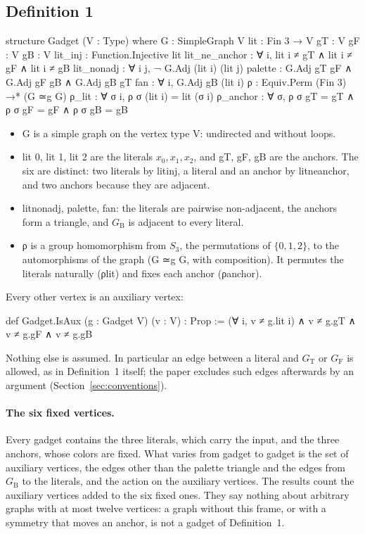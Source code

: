 \documentclass[11pt,a4paper]{article}
\newcommand{\leanus}{\textunderscore\allowbreak}
\newcommand{\lean}[1]{{\ttfamily\let\_\leanus #1}}
\newcommand{\GT}{G_{\mathrm{T}}}
\newcommand{\GF}{G_{\mathrm{F}}}
\newcommand{\GB}{G_{\mathrm{B}}}
\begin{document}
\subsection{Definition 1}
\begin{code}
structure Gadget (V : Type) where
  G : SimpleGraph V
  lit : Fin 3 → V
  gT : V
  gF : V
  gB : V
  lit_inj : Function.Injective lit
  lit_ne_anchor : ∀ i, lit i ≠ gT ∧ lit i ≠ gF ∧ lit i ≠ gB
  lit_nonadj : ∀ i j, ¬ G.Adj (lit i) (lit j)
  palette : G.Adj gT gF ∧ G.Adj gF gB ∧ G.Adj gB gT
  fan : ∀ i, G.Adj gB (lit i)
  ρ : Equiv.Perm (Fin 3) →* (G ≃g G)
  ρ_lit : ∀ σ i, ρ σ (lit i) = lit (σ i)
  ρ_anchor : ∀ σ, ρ σ gT = gT ∧ ρ σ gF = gF ∧ ρ σ gB = gB
\end{code}
\begin{itemize}
\item \lean{G} is a simple graph on the vertex type \lean{V}: undirected and
without loops.
\item \lean{lit 0}, \lean{lit 1}, \lean{lit 2} are the literals $x_0,x_1,x_2$,
and \lean{gT}, \lean{gF}, \lean{gB} are the anchors. The six are distinct:
two literals by \lean{lit\_inj}, a literal and an anchor by
\lean{lit\_ne\_anchor}, and two anchors because they are adjacent.
\item \lean{lit\_nonadj}, \lean{palette}, \lean{fan}: the literals are
pairwise non-adjacent, the anchors form a triangle, and $\GB$ is adjacent to
every literal.
\item \lean{ρ} is a group homomorphism from $S_3$, the permutations of
$\{0,1,2\}$, to the automorphisms of the graph (\lean{G ≃g G}, with
composition). It permutes the literals naturally (\lean{ρ\_lit}) and fixes
each anchor (\lean{ρ\_anchor}).
\end{itemize}
Every other vertex is an auxiliary vertex:
\begin{code}
def Gadget.IsAux (g : Gadget V) (v : V) : Prop :=
  (∀ i, v ≠ g.lit i) ∧ v ≠ g.gT ∧ v ≠ g.gF ∧ v ≠ g.gB
\end{code}
Nothing else is assumed. In particular an edge between a literal and $\GT$
or $\GF$ is allowed, as in Definition~1 itself; the paper excludes such edges
afterwards by an argument (Section~\ref{sec:conventions}).

\paragraph{The six fixed vertices.} Every gadget contains the three
literals, which carry the input, and the three anchors, whose colors are
fixed. What varies from gadget to gadget is the set of auxiliary vertices,
the edges other than the palette triangle and the edges from $\GB$ to the
literals, and the action on the auxiliary vertices. The results count the
auxiliary vertices added to the six fixed ones. They say nothing about
arbitrary graphs with at most twelve vertices: a graph without this frame,
or with a symmetry that moves an anchor, is not a gadget of Definition~1.
\end{document}
